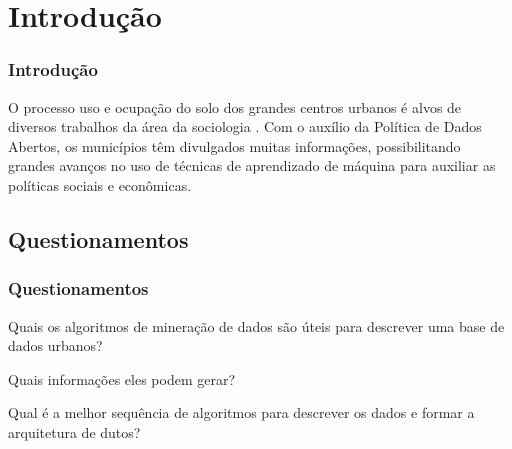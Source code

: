 \section{Introdução}

\begin{frame}

    \frametitle{Introdução}

    O processo uso e ocupação do solo dos grandes centros urbanos é alvos de diversos trabalhos da área da sociologia \cite{andrade2020urban, dos2019sapucai, solla2019resistencia}.
    \newline
    \newline
    Com o auxílio da Política de Dados Abertos, os municípios têm divulgados muitas informações, possibilitando grandes avanços no uso de técnicas de aprendizado de máquina para auxiliar as políticas sociais e econômicas.
\end{frame}

\subsection{Questionamentos}
\begin{frame}

    \frametitle{Questionamentos}

    \begin{questions}
        \item Quais os algoritmos de mineração de dados são úteis para descrever uma base de dados urbanos?
        \item Quais informações eles podem gerar?
        \item Qual é a melhor sequência de algoritmos para descrever os dados e formar a arquitetura de dutos?
\end{questions}
\end{frame}

